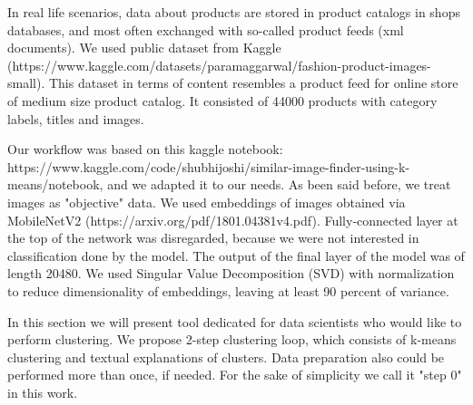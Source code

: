 \documentclass[
 twocolumn,
]{ceurart}
\begin{document}
In real life scenarios, data about products are stored in product catalogs in shops databases, and most often exchanged with so-called product feeds (xml documents).
We used public dataset from Kaggle (https://www.kaggle.com/datasets/paramaggarwal/fashion-product-images-small).
This dataset in terms of content resembles a product feed for online store of medium size product catalog.
It consisted of 44000 products with category labels, titles and images.

Our workflow was based on this kaggle notebook: https://www.kaggle.com/code/shubhijoshi/similar-image-finder-using-k-means/notebook, and we adapted it to our needs.
As been said before, we treat images as "objective" data.
We used embeddings of images obtained via MobileNetV2 (https://arxiv.org/pdf/1801.04381v4.pdf).
Fully-connected layer at the top of the network was disregarded, because we were not interested in classification done by the model.
The output of the final layer of the model was of length 20480.
We used Singular Value Decomposition (SVD) with normalization to reduce dimensionality of embeddings, leaving at least 90 percent of variance.

In this section we will present tool dedicated for data scientists who would like to perform clustering.
We propose 2-step clustering loop, which consists of k-means clustering and textual explanations of clusters.
Data preparation also could be performed more than once, if needed.
For the sake of simplicity we call it "step 0" in this work.
\end{document}
